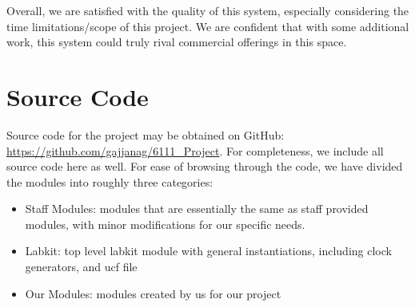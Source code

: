 \documentclass{article}
\begin{document}
Overall, we are satisfied with the quality of this system,
especially considering the time limitations/scope of this project.
We are confident that with some additional work,
this system could truly rival commercial offerings in this space.



\newpage

\appendix

\section{Source Code}
Source code for the project may be obtained on GitHub: \url{https://github.com/gajjanag/6111_Project}.
For completeness, we include all source code here as well.
For ease of browsing through the code, we have divided the modules into roughly three categories:
\begin{itemize}
\item Staff Modules: modules that are essentially the same as staff provided modules, with minor modifications for our specific needs.
\item Labkit: top level labkit module with general instantiations, including clock generators, and ucf file
\item Our Modules: modules created by us for our project
\end{itemize}
\end{document}
